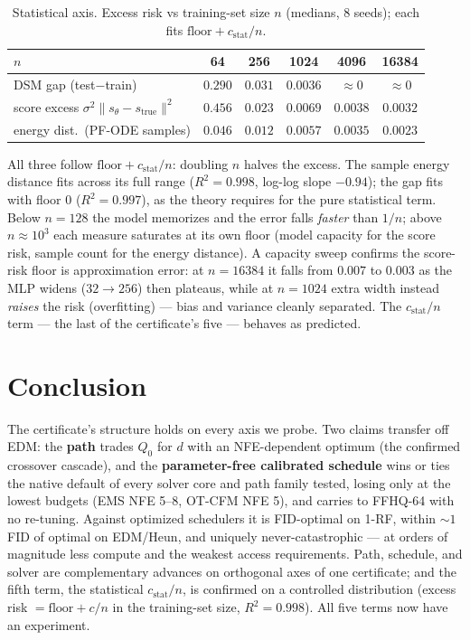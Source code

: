 \documentclass[11pt]{article}
\newcommand{\norm}[1]{\lVert #1 \rVert}
\begin{document}
\begin{table}[h]\centering
\caption{Statistical axis. Excess risk vs training-set size $n$ (medians, 8
seeds); each fits $\mathrm{floor}+c_{\mathrm{stat}}/n$.}
\label{tab:stat}
\begin{tabular}{lccccc}
\toprule
$n$ & 64 & 256 & 1024 & 4096 & 16384\\
\midrule
DSM gap (test$-$train) & $0.290$ & $0.031$ & $0.0036$ & ${\approx}0$ & ${\approx}0$\\
score excess $\sigma^2\norm{s_\theta-s_{\mathrm{true}}}^2$ & $0.456$ & $0.023$ & $0.0069$ & $0.0038$ & $0.0032$\\
energy dist.\ (PF-ODE samples) & $0.046$ & $0.012$ & $0.0057$ & $0.0035$ & $0.0023$\\
\bottomrule
\end{tabular}
\end{table}

\noindent All three follow $\mathrm{floor}+c_{\mathrm{stat}}/n$: doubling $n$
halves the excess. The sample energy distance fits across its full range
($R^2\!=\!0.998$, log-log slope $-0.94$); the gap fits with floor $0$
($R^2\!=\!0.997$), as the theory requires for the pure statistical term. Below
$n\!=\!128$ the model memorizes and the error falls \emph{faster} than $1/n$;
above $n\!\approx\!10^3$ each measure saturates at its own floor (model
capacity for the score risk, sample count for the energy distance). A capacity
sweep confirms the score-risk floor is approximation error: at $n\!=\!16384$ it
falls from $0.007$ to $0.003$ as the MLP widens ($32\!\to\!256$) then plateaus,
while at $n\!=\!1024$ extra width instead \emph{raises} the risk (overfitting)
--- bias and variance cleanly separated. The $c_{\mathrm{stat}}/n$ term ---
the last of the certificate's five --- behaves as predicted.

\section{Conclusion}
The certificate's structure holds on every axis we probe. Two claims transfer
off EDM: the \textbf{path} trades $Q_0$ for $d$ with an NFE-dependent optimum
(the confirmed crossover cascade), and the \textbf{parameter-free calibrated
schedule} wins or ties the native default of every solver core and path family
tested, losing only at the lowest budgets (EMS NFE 5--8, OT-CFM NFE 5), and
carries to FFHQ-64 with no re-tuning. Against optimized schedulers it is
FID-optimal on 1-RF, within $\sim\!1$ FID of optimal on EDM/Heun, and uniquely
never-catastrophic --- at orders of magnitude less compute and the weakest
access requirements. Path, schedule, and solver are complementary advances on
orthogonal axes of one certificate; and the fifth term, the statistical
$c_{\mathrm{stat}}/n$, is confirmed on a controlled distribution (excess risk
$=\mathrm{floor}+c/n$ in the training-set size, $R^2\!=\!0.998$). All five
terms now have an experiment.
\end{document}
